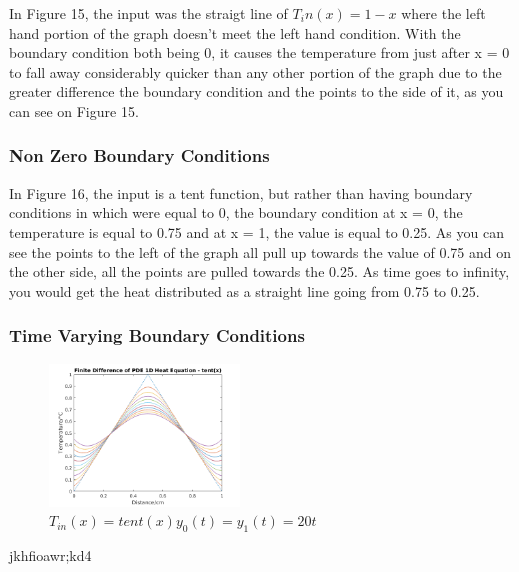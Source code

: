 \documentclass[11pt,a4paper]{article}
\begin{document}
In Figure 15, the input was the straigt line of $T_in(x) = 1-x$ where the left hand portion of the graph doesn't meet the left hand condition. With the boundary condition both being 0, it causes the temperature from just after x = 0 to fall away considerably quicker than any other portion of the graph due to the greater difference the boundary condition and the points to the side of it, as you can see on Figure 15.

\subsubsection{Non Zero Boundary Conditions}

In Figure 16, the input is a tent function, but rather than having boundary conditions in which were equal to 0, the boundary condition at x = 0, the temperature is equal to 0.75 and at x = 1, the value is equal to 0.25. As you can see the points to the left of the graph all pull up towards the value of 0.75 and on the other side, all the points are pulled towards the 0.25. As time goes to infinity, you would get the heat distributed as a straight line going from 0.75 to 0.25.

\pagebreak

\subsubsection{Time Varying Boundary Conditions}

\begin{figure}
	\vspace{-6mm}
	\includegraphics[width=0.45\textwidth]{Ex4_Figs/timevar.png}
	\vspace{-3mm}
	\caption{$T_{in}(x)= tent(x)  y_0(t) = y_1(t) = 20t$}
\end{figure}

jkhfioawr;kd4
\end{document}
